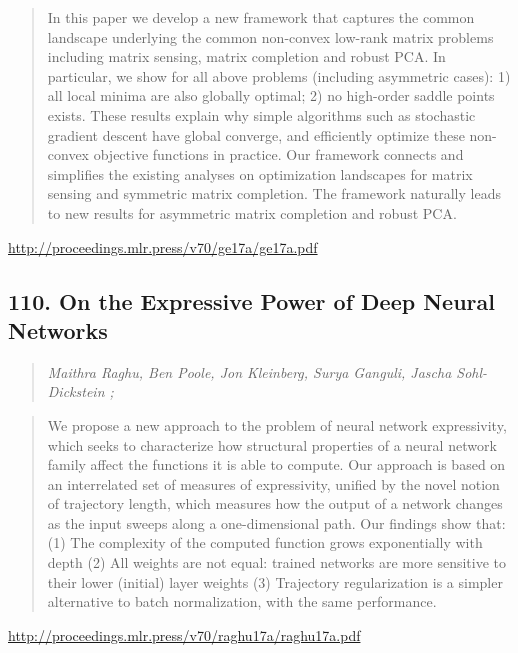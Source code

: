 \documentclass{article}
\begin{document}
\begin{quote}
    In this paper we develop a new framework that captures the common landscape underlying the common non-convex low-rank matrix problems including matrix sensing, matrix completion and robust PCA. In particular, we show for all above problems (including asymmetric cases): 1) all local minima are also globally optimal; 2) no high-order saddle points exists. These results explain why simple algorithms such as stochastic gradient descent have global converge, and efficiently optimize these non-convex objective functions in practice. Our framework connects and simplifies the existing analyses on optimization landscapes for matrix sensing and symmetric matrix completion. The framework naturally leads to new results for asymmetric matrix completion and robust PCA.  \end{quote}

\href{http://proceedings.mlr.press/v70/ge17a/ge17a.pdf}{http://proceedings.mlr.press/v70/ge17a/ge17a.pdf}

\subsection{110. On the Expressive Power of Deep Neural Networks}

\begin{quote}
\footnotesize{\textit{Maithra Raghu, Ben Poole, Jon Kleinberg, Surya Ganguli, Jascha Sohl-Dickstein ;}}
\end{quote}

\begin{quote}
    We propose a new approach to the problem of neural network expressivity, which seeks to characterize how structural properties of a neural network family affect the functions it is able to compute. Our approach is based on an interrelated set of measures of expressivity, unified by the novel notion of trajectory length, which measures how the output of a network changes as the input sweeps along a one-dimensional path. Our findings show that: (1) The complexity of the computed function grows exponentially with depth (2) All weights are not equal: trained networks are more sensitive to their lower (initial) layer weights (3) Trajectory regularization is a simpler alternative to batch normalization, with the same performance.  \end{quote}

\href{http://proceedings.mlr.press/v70/raghu17a/raghu17a.pdf}{http://proceedings.mlr.press/v70/raghu17a/raghu17a.pdf}
\end{document}
